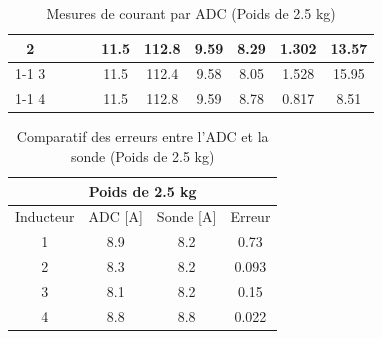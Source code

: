\begin{table}[H]
{\begin{tabular}{|c|c|c|c|c|c|c|c|c|c|}
            2         &                                                            &                           &                                                         & 11.5                                                     & 112.8                                                   & 9.59                                                                & 8.29                                                  & 1.302  & 13.57                                                             \\ \cline{1-1} \cline{5-10}
            3         &                                                            &                           &                                                         & 11.5                                                     & 112.4                                                   & 9.58                                                                & 8.05                                                  & 1.528  & 15.95                                                             \\ \cline{1-1} \cline{5-10}
            4         &                                                            &                           &                                                         & 11.5                                                     & 112.8                                                   & 9.59                                                                & 8.78                                                  & 0.817  & 8.51                                                              \\ \hline
        \end{tabular}%
    }
    \caption{Mesures de courant par ADC (Poids de 2.5 kg)}
    \label{tab:poids_2_5_adc}
\end{table}

\begin{table}[H]
    \centering
    \begin{tabular}{|c|c|c|c|}
        \hline
        \multicolumn{4}{|c|}{\textbf{Poids de 2.5 kg}}   \\ \hline
        Inducteur & ADC {[}A{]} & Sonde {[}A{]} & Erreur \\ \hline
        1         & 8.9         & 8.2           & 0.73   \\ \hline
        2         & 8.3         & 8.2           & 0.093  \\ \hline
        3         & 8.1         & 8.2           & 0.15   \\ \hline
        4         & 8.8         & 8.8           & 0.022  \\ \hline
    \end{tabular}
    \caption{Comparatif des erreurs entre l'ADC et la sonde (Poids de 2.5 kg)}
    \label{tab:poids_2_5_comp}
\end{table}

